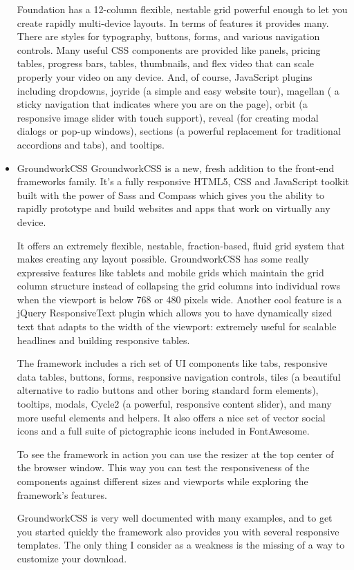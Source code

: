 \begin{itemize}
Foundation has a 12-column flexible, nestable grid powerful enough to let you create rapidly multi-device layouts. In terms of features it provides many. There are styles for typography, buttons, forms, and various navigation controls. Many useful CSS components are provided like panels, pricing tables, progress bars, tables, thumbnails, and flex video that can scale properly your video on any device. And, of course, JavaScript plugins including dropdowns, joyride (a simple and easy website tour), magellan ( a sticky navigation that indicates where you are on the page), orbit (a responsive image slider with touch support), reveal (for creating modal dialogs or pop-up windows),  sections (a powerful replacement for traditional accordions and tabs), and tooltips.
\item GroundworkCSS
\newline
GroundworkCSS is a new, fresh addition to the front-end frameworks family. It’s a fully responsive HTML5, CSS and JavaScript toolkit built with the power of Sass and Compass which gives you the ability to rapidly prototype and build websites and apps that work on virtually any device.

It offers an extremely flexible, nestable, fraction-based, fluid grid system that makes creating any layout possible. GroundworkCSS has some really expressive features like tablets and mobile grids which maintain the grid column structure instead of collapsing the grid columns into individual rows when the viewport is below 768 or 480 pixels wide. Another cool feature is a jQuery ResponsiveText plugin which allows you to have dynamically sized text that adapts to the width of the viewport: extremely useful for scalable headlines and building responsive tables.

The framework includes a rich set of UI components like tabs, responsive data tables, buttons, forms, responsive navigation controls, tiles (a beautiful alternative to radio buttons and other boring standard form elements), tooltips, modals, Cycle2 (a powerful, responsive content slider), and many more useful elements and helpers. It also offers a nice set of vector social icons and a full suite of pictographic icons included in FontAwesome.

To see the framework in action you can use the resizer at the top center of the browser window. This way you can test the responsiveness of the components against different sizes and viewports while exploring the framework’s features.

GroundworkCSS is very well documented with many examples, and to get you started quickly the framework also provides you with several responsive templates. The only thing I consider as a weakness is the missing of a way to customize your download.


\end{itemize}
